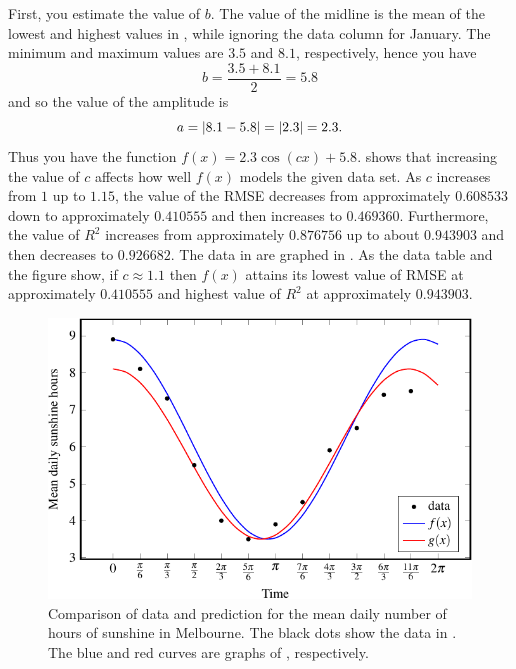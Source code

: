 \documentclass[a4paper,oneside,12pt]{article}
\begin{document}
\begin{problem}
{\begin{solution}
First, you estimate the value of $b$.  The value of the midline is the
mean of the lowest and highest values in
, while ignoring the data
column for January.  The minimum and maximum values are $3.5$ and
$8.1$, respectively, hence you have
\[
b
=
\frac{3.5 + 8.1}{2}
=
5.8
\]
and so the value of the amplitude is
\[
a
=
\lvert8.1 - 5.8\rvert
=
\lvert2.3\rvert
=
2.3.
\]
Thus you have the function $f(x) = 2.3 \cos(cx) + 5.8$.
shows that increasing the value of $c$ affects how well $f(x)$ models
the given data set.  As $c$ increases from $1$ up to $1.15$, the value
of the RMSE decreases from approximately $0.608533$ down to
approximately $0.410555$ and then increases to $0.469360$.
Furthermore, the value of $R^2$ increases from approximately
$0.876756$ up to about $0.943903$ and then decreases to $0.926682$.
The data in
are graphed in
.
As the data table and the figure show, if $c \approx 1.1$ then $f(x)$
attains its lowest value of RMSE at approximately $0.410555$ and
highest value of $R^2$ at approximately $0.943903$.

\begin{figure}[!htbp]
\centering
\includegraphics[scale=1.1]{image/13/mean-daily-sunshine-models.pdf}
\caption{%
  Comparison of data and prediction for the mean daily number of hours
  of sunshine in Melbourne.  The black dots show the data in
  .  The blue and red
  curves are graphs of
  ,
  respectively.
}
\label{fig:trigonometric:mean_daily_sunshine_models}
\end{figure}


\end{solution}}
\end{problem}
\end{document}
